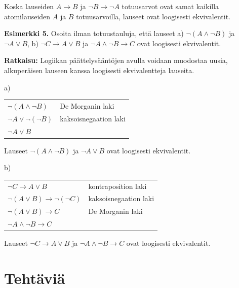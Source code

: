 \bigskip

Koska lauseiden $A\to B$ ja $\lnot B \to \lnot A$ totuusarvot ovat samat kaikilla atomilauseiden $A$ ja $B$ totuusarvoilla, lauseet ovat loogisesti ekvivalentit.


{\bf Esimerkki 5.} 
Osoita ilman totuustauluja, että lauseet  a) $\lnot(A \land \lnot B)$  ja  $\lnot A \lor B$,    b)  
$\lnot C\to A \lor B$ ja $\lnot A \land \lnot B \to C$ ovat loogisesti ekvivalentit.

{\bf Ratkaisu:}
Logiikan päättelysääntöjen avulla voidaan muodostaa uusia, alkuperäisen lauseen kanssa loogisesti ekvivalentteja lauseita.

a)

\begin{tabular}{ll}
$\lnot (A \land \lnot B)$ & De Morganin laki \\
$\lnot A \lor \lnot (\lnot B)$ & kaksoisnegaation laki \\
$\lnot A \lor B$ & \\
\end{tabular}

Lauseet $\lnot(A \land \lnot B)$  ja  $\lnot A \lor B$ ovat loogisesti ekvivalentit.

b)

\begin{tabular}{ll}
$\lnot C \to A \lor B$ & kontraposition laki \\
$\lnot (A\lor B)\to \lnot(\lnot C)$ & kaksoisnegaation laki \\
$\lnot (A \lor B) \to C$ & De Morganin laki\\
$\lnot A \land \lnot B \to C$
\end{tabular}

Lauseet $\lnot C\to A \lor B$ ja $\lnot A \land \lnot B \to C$ ovat loogisesti ekvivalentit.


\newpage


\section*{Tehtäviä}

